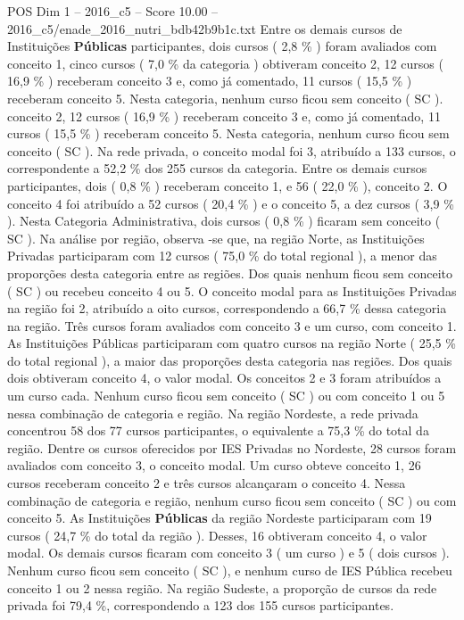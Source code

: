 \begin{textsample}{POS Dim 1 – 2016\_c5 – Score 10.00 – 2016\_c5/enade\_2016\_nutri\_bdb42b9b1c.txt}
Entre os demais cursos de Instituições \textbf{Públicas} participantes, dois cursos ( 2,8 \% ) foram avaliados com conceito 1, cinco cursos ( 7,0 \% da categoria ) obtiveram conceito 2, 12 cursos ( 16,9 \% ) receberam conceito 3 e, como já comentado, 11 cursos ( 15,5 \% ) receberam conceito 5.
Nesta categoria, nenhum curso ficou sem conceito ( SC ). conceito 2, 12 cursos ( 16,9 \% ) receberam conceito 3 e, como já comentado, 11 cursos ( 15,5 \% ) receberam conceito 5.
Nesta categoria, nenhum curso ficou sem conceito ( SC ).
Na rede privada, o conceito modal foi 3, atribuído a 133 cursos, o correspondente a 52,2 \% dos 255 cursos da categoria.
Entre os demais cursos participantes, dois ( 0,8 \% ) receberam conceito 1, e 56 ( 22,0 \% ), conceito 2.
O conceito 4 foi atribuído a 52 cursos ( 20,4 \% ) e o conceito 5, a dez cursos ( 3,9 \% ).
Nesta Categoria Administrativa, dois cursos ( 0,8 \% ) ficaram sem conceito ( SC ).
Na análise por região, observa -se que, na região Norte, as Instituições Privadas participaram com 12 cursos ( 75,0 \% do total regional ), a menor das proporções desta categoria entre as regiões.
Dos quais nenhum ficou sem conceito ( SC ) ou recebeu conceito 4 ou 5.
O conceito modal para as Instituições Privadas na região foi 2, atribuído a oito cursos, correspondendo a 66,7 \% dessa categoria na região.
Três cursos foram avaliados com conceito 3 e um curso, com conceito 1.
As Instituições Públicas participaram com quatro cursos na região Norte ( 25,5 \% do total regional ), a maior das proporções desta categoria nas regiões.
Dos quais dois obtiveram conceito 4, o valor modal.
Os conceitos 2 e 3 foram atribuídos a um curso cada.
Nenhum curso ficou sem conceito ( SC ) ou com conceito 1 ou 5 nessa combinação de categoria e região.
Na região Nordeste, a rede privada concentrou 58 dos 77 cursos participantes, o equivalente a 75,3 \% do total da região.
Dentre os cursos oferecidos por IES Privadas no Nordeste, 28 cursos foram avaliados com conceito 3, o conceito modal.
Um curso obteve conceito 1, 26 cursos receberam conceito 2 e três cursos alcançaram o conceito 4.
Nessa combinação de categoria e região, nenhum curso ficou sem conceito ( SC ) ou com conceito 5.
As Instituições \textbf{Públicas} da região Nordeste participaram com 19 cursos ( 24,7 \% do total da região ).
Desses, 16 obtiveram conceito 4, o valor modal.
Os demais cursos ficaram com conceito 3 ( um curso ) e 5 ( dois cursos ).
Nenhum curso ficou sem conceito ( SC ), e nenhum curso de IES Pública recebeu conceito 1 ou 2 nessa região.
Na região Sudeste, a proporção de cursos da rede privada foi 79,4 \%, correspondendo a 123 dos 155 cursos participantes.

\end{textsample}
